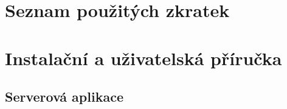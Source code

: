 \chapter{Seznam použitých zkratek}
\renewcommand{\glossarysection}[2][]{}
\printglossary[type=acronym]




\chapter{Instalační a uživatelská příručka}
\section{Serverová aplikace}

